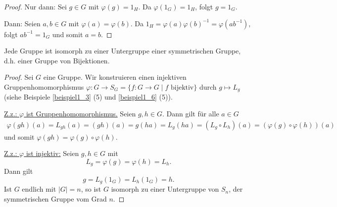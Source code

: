 \begin{beispiel}
\begin{enumerate}
		\begin{proof}
			\glqq{}Nur dann\grqq: Sei $g \in G$ mit $\varphi(g) = 1_H$. Da $\varphi(1_G) = 1_H$, folgt $g = 1_G$.
			
			\glqq{}Dann\grqq: Seien $a,b \in G$ mit $\varphi(a) = \varphi(b)$. Da $1_H = \varphi(a) \varphi(b)^{-1} = \varphi(ab^{-1})$, folgt $ab^{-1} = 1_G$ und somit $a = b$.
		\end{proof}
	\end{enumerate}
\end{beispiel}

\begin{satz}\label{satz1_7}
	Jede Gruppe ist isomorph zu einer Untergruppe einer symmetrischen Gruppe, d.h. einer Gruppe von Bijektionen.
\end{satz}
\begin{proof}
	Sei $G$ eine Gruppe. Wir konstruieren einen injektiven Gruppenhomomorphismus $\varphi \colon G \to S_G = \{f \colon G \to G \mid f \text{ bijektiv}\}$ durch $g \mapsto L_g$ (siehe Beispiele \ref{beispiel1_3} (5) und \ref{beispiel1_6} (5)). 
	
	\underline{Z.z.: $\varphi$ ist Gruppenhomomorphismus.} Seien $g, h \in G$. Dann gilt für alle $a \in G$
	\begin{align*}
		\varphi(gh)(a) = L_{gh}(a) = (gh)(a) = g(ha) = L_g(ha) = (L_g \circ L_h)(a) = (\varphi(g) \circ \varphi(h))(a)
	\end{align*} 
	und somit $\varphi(gh) = \varphi(g) \circ \varphi(h)$. 
	
	\underline{Z.z.: $\varphi$ ist injektiv:} Seien $g,h \in G$ mit
	\[L_g = \varphi(g) = \varphi(h) = L_h.\]
	Dann gilt 
	\[g = L_g(1_G) = L_h(1_G) = h.\]
	Ist $G$ endlich mit $|G| = n$, so ist $G$ isomorph zu einer Untergruppe von $S_n$, der symmetrischen Gruppe vom Grad $n$.
\end{proof}
